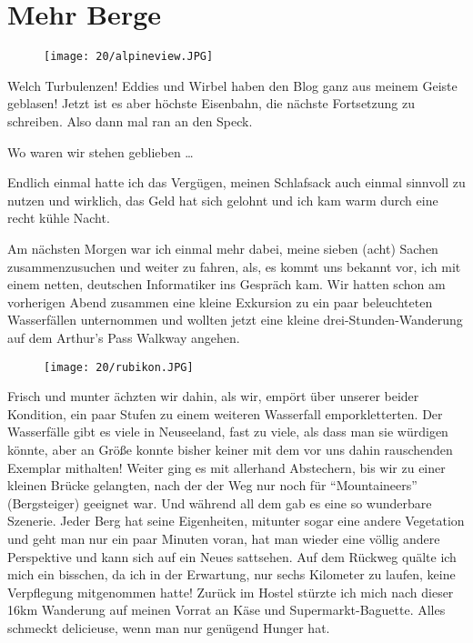 \chapter{Mehr Berge}
\begin{figure}[h]
  \centering
  \texttt{[image: 20/alpineview.JPG]}
\end{figure}

Welch Turbulenzen! Eddies und Wirbel haben den Blog ganz aus meinem
Geiste geblasen! Jetzt ist es aber höchste Eisenbahn, die nächste
Fortsetzung zu schreiben. Also dann mal ran an den Speck.

Wo waren wir stehen geblieben \ldots{}

Endlich einmal hatte ich das Vergügen, meinen Schlafsack auch einmal
sinnvoll zu nutzen und wirklich, das Geld hat sich gelohnt und ich kam
warm durch eine recht kühle Nacht.

Am nächsten Morgen war ich einmal mehr dabei, meine sieben (acht)
Sachen zusammenzusuchen und weiter zu fahren, als, es kommt uns
bekannt vor, ich mit einem netten, deutschen Informatiker ins Gespräch
kam. Wir hatten schon am vorherigen Abend zusammen eine kleine
Exkursion zu ein paar beleuchteten Wasserfällen unternommen und
wollten jetzt eine kleine drei-Stunden-Wanderung auf dem Arthur's Pass
Walkway angehen.

\begin{figure}[h]
  \centering
  \texttt{[image: 20/rubikon.JPG]}
\end{figure}
Frisch und munter ächzten wir dahin, als wir, empört über unserer
beider Kondition, ein paar Stufen zu einem weiteren Wasserfall
emporkletterten. Der Wasserfälle gibt es viele in Neuseeland, fast zu
viele, als dass man sie würdigen könnte, aber an Größe konnte bisher
keiner mit dem vor uns dahin rauschenden Exemplar mithalten! Weiter
ging es mit allerhand Abstechern, bis wir zu einer kleinen Brücke
gelangten, nach der der Weg nur noch für ``Mountaineers''
(Bergsteiger) geeignet war. Und während all dem gab es eine so
wunderbare Szenerie. Jeder Berg hat seine Eigenheiten, mitunter sogar
eine andere Vegetation und geht man nur ein paar Minuten voran, hat
man wieder eine völlig andere Perspektive und kann sich auf ein Neues
sattsehen. Auf dem Rückweg quälte ich mich ein bisschen, da ich in der
Erwartung, nur sechs Kilometer zu laufen, keine Verpflegung
mitgenommen hatte! Zurück im Hostel stürzte ich mich nach dieser 16km
Wanderung auf meinen Vorrat an Käse und Supermarkt-Baguette.  Alles
schmeckt delicieuse, wenn man nur genügend Hunger hat.

